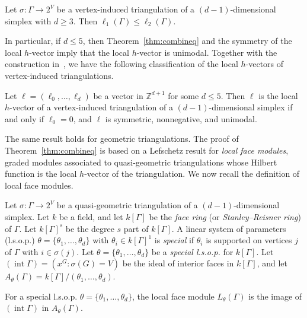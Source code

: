 \begin{theo}\label{thm:combineq}
Let $\sigma \colon \Gamma \to 2^V$ be a vertex-induced triangulation of a $(d-1)$-dimensional simplex with $d \ge 3$. Then $\ell_1(\Gamma) \le \ell_2(\Gamma)$. 
\end{theo}

In particular, if $d \le 5$, then Theorem~\ref{thm:combineq} and the symmetry of the local $h$-vector imply that the local $h$-vector is unimodal. Together with the construction in~\cite{ChanLocal}, we have the following classification of the local $h$-vectors of vertex-induced triangulations. 

\begin{coro}
Let $\ell = (\ell_0, \dotsc, \ell_d)$ be a vector in $\mathbb{Z}^{d+1}$ for some $d \le 5$. Then $\ell$ is the local $h$-vector of a vertex-induced triangulation of a $(d-1)$-dimensional simplex if and only if $\ell_0 = 0$, and $\ell$ is symmetric, nonnegative, and unimodal. 
\end{coro}

The same result holds for geometric triangulations. The proof of Theorem~\ref{thm:combineq} is based on a Lefschetz result for \emph{local face modules}, graded modules associated to quasi-geometric triangulations whose Hilbert function is the local $h$-vector of the triangulation. We now recall the definition of local face modules. 

Let $\sigma \colon \Gamma \to 2^V$ be a quasi-geometric triangulation of a $(d-1)$-dimensional simplex. 
Let $k$ be a field, and let $k[\Gamma]$ be the \emph{face ring} (or \emph{Stanley--Reisner ring}) of $\Gamma$. Let $k[\Gamma]^s$ be the degree $s$ part of $k[\Gamma]$. 
A linear system of parameters (l.s.o.p.) 
$ \theta = \{ \theta_1,\ldots,\theta_d \}$ with $\theta_i \in k[\Gamma]^1$
is \emph{special} if $\theta_i$ is supported on vertices $j$ of $\Gamma$ with $i \in \sigma(j)$. 
Let $\theta = \{ \theta_1,\ldots,\theta_d \}$ be a \emph{special l.s.o.p.} for $k[\Gamma]$.   Let $(\operatorname{int} \Gamma) = (x^G : \sigma(G) = V)$ be the ideal of interior faces in $k[\Gamma]$, and  let $A_{\theta}(\Gamma) = k[\Gamma]/(\theta_1, \dotsc, \theta_d)$.

\begin{defi}\label{def:localfacemodule}
For a special l.s.o.p. 
$\theta = \{ \theta_1,\ldots,\theta_d \}$,
the local face module $L_{\theta}(\Gamma)$ is the image of $(\operatorname{int} \Gamma)$ in
$A_{\theta}(\Gamma)$. 
\end{defi}

